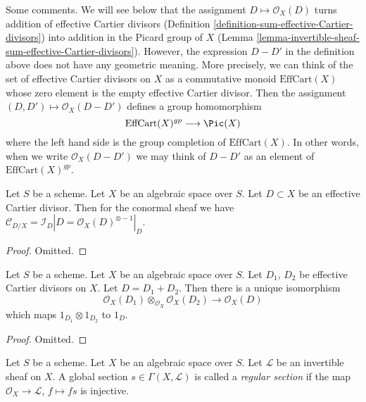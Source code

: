 \noindent
Some comments. We will see below that the assignment
$D \mapsto \mathcal{O}_X(D)$ turns addition of effective Cartier
divisors (Definition \ref{definition-sum-effective-Cartier-divisors})
into addition in the Picard group of $X$
(Lemma \ref{lemma-invertible-sheaf-sum-effective-Cartier-divisors}).
However, the expression $D - D'$ in the definition above does not
have any geometric meaning. More precisely, we can think of the
set of effective Cartier divisors on $X$ as a commutative monoid
$\text{EffCart}(X)$ whose zero element is the empty effective Cartier divisor.
Then the assignment $(D, D') \mapsto \mathcal{O}_X(D - D')$ defines
a group homomorphism
$$
\text{EffCart}(X)^{gp} \longrightarrow \Pic(X)
$$
where the left hand side is the group completion of
$\text{EffCart}(X)$. In other words, when we write $\mathcal{O}_X(D - D')$
we may think of $D - D'$ as an element of $\text{EffCart}(X)^{gp}$.

\begin{lemma}
\label{lemma-conormal-effective-Cartier-divisor}
Let $S$ be a scheme. Let $X$ be an algebraic space over $S$.
Let $D \subset X$ be an effective Cartier divisor.
Then for the conormal sheaf we have $\mathcal{C}_{D/X} = \mathcal{I}_D|D =
\mathcal{O}_X(D)^{\otimes -1}|_D$.
\end{lemma}

\begin{proof}
Omitted.
\end{proof}

\begin{lemma}
\label{lemma-invertible-sheaf-sum-effective-Cartier-divisors}
Let $S$ be a scheme. Let $X$ be an algebraic space over $S$.
Let $D_1$, $D_2$ be effective Cartier divisors on $X$.
Let $D = D_1 + D_2$.
Then there is a unique isomorphism
$$
\mathcal{O}_X(D_1) \otimes_{\mathcal{O}_X} \mathcal{O}_X(D_2)
\longrightarrow
\mathcal{O}_X(D)
$$
which maps $1_{D_1} \otimes 1_{D_2}$ to $1_D$.
\end{lemma}

\begin{proof}
Omitted.
\end{proof}

\begin{definition}
\label{definition-regular-section}
Let $S$ be a scheme. Let $X$ be an algebraic space over $S$.
Let $\mathcal{L}$ be an invertible sheaf on $X$.
A global section $s \in \Gamma(X, \mathcal{L})$ is called a
{\it regular section} if the map $\mathcal{O}_X \to \mathcal{L}$,
$f \mapsto fs$ is injective.
\end{definition}

